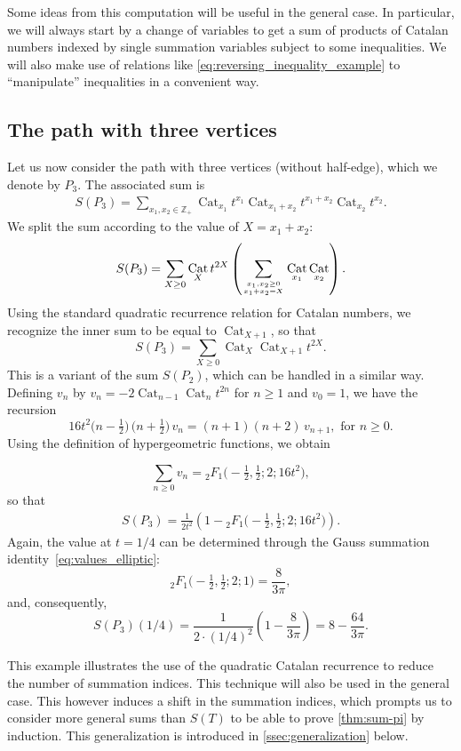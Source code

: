 \documentclass[12pt]{amsart}
\theoremstyle{plain}
\theoremstyle{remark}
\def\Z{\mathbb{Z}}
\DeclareMathOperator{\Cat}{Cat}
\begin{document}
Some ideas from this computation will be useful in the general case.
In particular,
we will always start by a change of variables to get a sum of products of Catalan numbers
indexed by single summation variables subject to some inequalities.
We will also make use of relations like \eqref{eq:reversing_inequality_example} to \enquote{manipulate} inequalities in a convenient way.

\subsection{The path with three vertices}
\label{ssec:ex_P3}
Let us now consider the path with three vertices (without half-edge),
which we denote by $P_3$.
The associated sum is 
\begin{align*}
  S(P_3) = \sum_{x_1,x_2 \in \Z_+} \Cat_{x_1} t^{x_1} \Cat_{x_1+x_2} t^{x_1+x_2} \Cat_{x_2} t^{x_2}.
\end{align*}
We split the sum according to the value of $X=x_1+x_2$:
\[ S(P_3) =\sum_{X \ge 0} \Cat_X t^{2X} \left( \sum_{x_1,x_2 \ge 0 \atop x_1+x_2=X} \Cat_{x_1} \Cat_{x_2} \right).\]
Using the standard quadratic recurrence relation for Catalan numbers, we recognize the inner sum to be equal to $\Cat_{X+1}$, so that
\[ S(P_3) =\sum_{X \ge 0} \Cat_X \Cat_{X+1} t^{2X}.\]
This is a variant of the sum $S(P_2)$, which can be handled in a similar way.
Defining $v_n$ by $v_n=-2\Cat_{n-1} \Cat_n t^{2n}$ for $n \ge 1$ and $v_0=1$, we have the recursion 
\[16 t^2\big(n-\tfrac12\big)\, \big(n+\tfrac12\big) \, v_n = (n+1)(n+2) \, v_{n+1}, \text{ for $n \ge 0$.}\]
Using the definition of hypergeometric functions, we obtain

\[\sum_{ n \ge 0} v_n = {}_{2}^{}{{}{{}{F_{1}^{}}}}\big(-\tfrac12,\tfrac12; 2;16t^2\big), \]
so that
\begin{align*}
S(P_3) = \frac{1}{2t^2}\left(1-{}_{2}^{}{{}{{}{F_{1}^{}}}}\big(-\tfrac12,\tfrac12; 2;16t^2\big)\right).
\end{align*}
Again, the value at $t=1/4$ can be determined through the Gauss summation identity~\eqref{eq:values_elliptic}:
\[ {}_{2}^{}{{}{{}{F_{1}^{}}}}\big(-\tfrac12,\tfrac12; 2;1\big) = \frac{8}{3\pi},\]
and, consequently,
\[  S(P_3)(1/4)= \frac{1}{2 \cdot (1/4)^2}\left(1-\frac{8}{3\pi} \right) = 8- \frac{64}{3\pi}.\]

This example illustrates the use of the quadratic Catalan recurrence to reduce the number of summation indices.
This technique will also be used in the general case.
This however induces a shift in the summation indices, which prompts us
to consider more general sums than $S(T)$ to be able to prove \cref{thm:sum-pi} 
by induction. This generalization is introduced in \cref{ssec:generalization} below.
\end{document}
